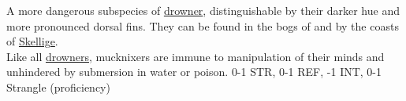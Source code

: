 {
    A more dangerous subspecies of \hyperref[monster:drowner]{drowner}, distinguishable by their darker hue and 
    more pronounced dorsal fins. They can be found in the bogs of  and by the coasts of
    \hyperref[region:skellige]{Skellige}.
    \\[1.5ex]
    Like all \hyperref[monster:drowner]{drowners}, mucknixers are immune to manipulation of their minds and
    unhindered by submersion in water or poison.
}{
    0-1 STR, 0-1 REF, -1 INT, 0-1 Strangle (proficiency)
}
